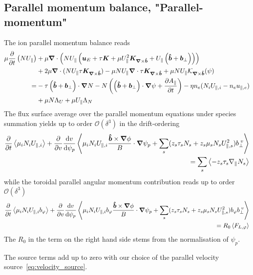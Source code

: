 \subsection{Parallel momentum balance, "Parallel-momentum"}
The ion parallel momentum balance reads
\begin{align}
    \mu \frac{\partial}{\partial t} \left(N U_\parallel\right) &+ \mu {\boldsymbol{\nabla}}\cdot \left( NU_\parallel \left(
    {\boldsymbol{u}}_E + \tau {\boldsymbol{K}} + \mu U_\parallel^2 {{\boldsymbol{K}}_{{\boldsymbol{\nabla}}\times\bm{\hat{b}}}} + U_\parallel\left(\bm{\hat{b}} + {{\boldsymbol{b}}}_\perp\right)
    \right)\right)  \nonumber \\
    &+ 2\mu {\boldsymbol{\nabla}}\cdot ( NU_\parallel \tau {{\boldsymbol{K}}_{{\boldsymbol{\nabla}}\times\bm{\hat{b}}}})
    -\mu NU_\parallel{\boldsymbol{\nabla}}\cdot \tau {{\boldsymbol{K}}_{{\boldsymbol{\nabla}}\times\bm{\hat{b}}}}
    + \mu NU_\parallel\mathcal K_{{\boldsymbol{\nabla}}\times\bm{\hat{b}}}(\psi) \nonumber\\
    =& -\tau \left(\bm{\hat{b}} + {{\boldsymbol{b}}}_\perp\right)\cdot{\boldsymbol{\nabla}} N
    -N \left( \left(\bm{\hat{b}}+{{\boldsymbol{b}}}_\perp\right)\cdot{\boldsymbol{\nabla}} \psi + \frac{\partial A_\parallel}{\partial t}\right)
    - \eta n_e(N_iU_{\parallel,i}-n_eu_{\parallel,e})
    \nonumber\\
    &+ \mu N\Lambda_U + \mu U_\parallel \Lambda_N
\end{align}
The flux surface average over the parallel momentum equations under species summation  yields up to order $\mathcal O(\delta^3)$ in the drift-ordering
\begin{align}
  \frac{\partial}{\partial t}\left \langle \mu_iN_iU_{\parallel,i}  \right \rangle
    + \frac{\partial}{\partial v} \frac{\mathrm{d} v}{\mathrm{d}\psi_p} \left \langle \mu_iN_iU_{\parallel,i} \frac{\bm{\hat{b}}\times{\boldsymbol{\nabla}}\phi}{B}\cdot{\boldsymbol{\nabla}}\psi_p + \sum_s (z_s\tau_sN_s + z_s\mu_s N_sU_{\parallel,s}^2) b_{\perp}^{\;v}   \right \rangle
    \nonumber\\
   = \sum_s\left \langle -z_s\tau_s \nabla_\parallel N_s \right \rangle
   \label{eq:parallel_momentum}
\end{align}
while the toroidal parallel angular momentum contribution reads up to order $\mathcal O(\delta^3)$
\begin{align}\label{eq:parallel_momentum_direction}
    \frac{\partial}{\partial t}  \left \langle \mu_iN_iU_{\parallel,i} b_\varphi \right \rangle
    + \frac{\partial}{\partial v} \frac{\mathrm{d} v}{\mathrm{d}\psi_p} \left \langle \mu_iN_iU_{\parallel,i} b_\varphi\frac{\bm{\hat{b}}\times{\boldsymbol{\nabla}}\phi}{B}\cdot{\boldsymbol{\nabla}}\psi_p + \sum_s (z_s\tau_s N_s + z_s\mu_sN_sU_{\parallel,s}^2) b_\varphi b_{\perp}^{\;v}  \right \rangle
    \nonumber\\
    = R_0 \left \langle F_{L,\varphi} \right \rangle
\end{align}
The $R_0$ in the term on the right hand side stems from the normalisation of $\psi_p$.
\begin{tcolorbox}[title=Note]
The source terms add up to zero with our choice of the parallel velocity source~\eqref{eq:velocity_source}.
\end{tcolorbox}
